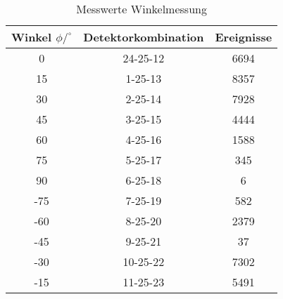 \begin{table}[h]
\centering
\small
\caption{Messwerte Winkelmessung}
\label{tab:winkel}
\begin{tabular}{ccc}
\toprule
Winkel $\phi/^\circ$& Detektorkombination & Ereignisse\\
\midrule
0 &	24-25-12	&6694\\
15&	1-25-13	&8357\\
30&	2-25-14	&7928\\
45&	3-25-15	&4444\\
60&	4-25-16	&1588\\
75&	5-25-17	&345\\
90&	6-25-18	&6\\
-75&7-25-19	&582\\
-60&8-25-20	&2379\\
-45&9-25-21	&37\\
-30&10-25-22	&7302\\
-15&11-25-23	&5491\\
\bottomrule
\end{tabular}
\end{table}

